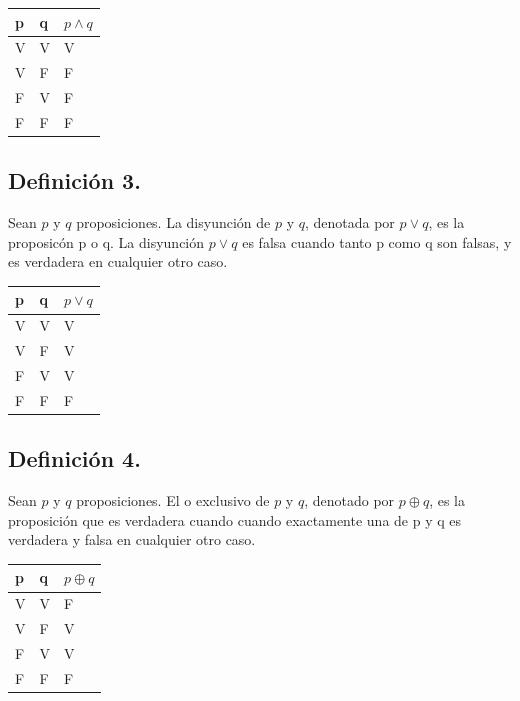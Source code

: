 \documentclass[
  letterpaper,
  DIV=11,
  numbers=noendperiod]{scrartcl}
\begin{document}
\begin{longtable}[]{@{}lll@{}}
\toprule\noalign{}
p & q & \(p \land q\) \\
\midrule\noalign{}
\endhead
\bottomrule\noalign{}
\endlastfoot
V & V & V \\
V & F & F \\
F & V & F \\
F & F & F \\
\end{longtable}

\subsection{Definición 3.}\label{definiciuxf3n-3.}

Sean \(p\) y \(q\) proposiciones. La disyunción de \(p\) y \(q\),
denotada por \(p \lor q\), es la proposicón p o q. La disyunción
\(p \lor q\) es falsa cuando tanto p como q son falsas, y es verdadera
en cualquier otro caso.

\begin{longtable}[]{@{}lll@{}}
\toprule\noalign{}
p & q & \(p \lor q\) \\
\midrule\noalign{}
\endhead
\bottomrule\noalign{}
\endlastfoot
V & V & V \\
V & F & V \\
F & V & V \\
F & F & F \\
\end{longtable}

\subsection{Definición 4.}\label{definiciuxf3n-4.}

Sean \(p\) y \(q\) proposiciones. El o exclusivo de \(p\) y \(q\),
denotado por \(p \oplus q\), es la proposición que es verdadera cuando
cuando exactamente una de p y q es verdadera y falsa en cualquier otro
caso.

\begin{longtable}[]{@{}lll@{}}
\toprule\noalign{}
p & q & \(p \oplus q\) \\
\midrule\noalign{}
\endhead
\bottomrule\noalign{}
\endlastfoot
V & V & F \\
V & F & V \\
F & V & V \\
F & F & F \\
\end{longtable}
\end{document}
